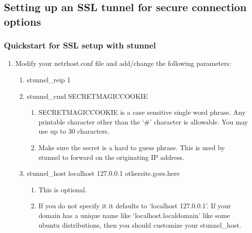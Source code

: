 \documentclass[letterpaper,10pt,english]{sphinxmanual}
\begin{document}
\subsection{Setting up an SSL tunnel for secure connection options}
\label{\detokenize{security:setting-up-an-ssl-tunnel-for-secure-connection-options}}

\subsubsection{Quickstart for SSL setup with stunnel}
\label{\detokenize{security:quickstart-for-ssl-setup-with-stunnel}}\begin{enumerate}
%
\item {} 
\sphinxAtStartPar
Modify your netrhost.conf file and add/change the following parameters:
\begin{enumerate}
%
\item {} 
\sphinxAtStartPar
stunnel\_reip 1

\item {} 
\sphinxAtStartPar
stunnel\_cmd SECRET\sphinxhyphen{}MAGIC\sphinxhyphen{}COOKIE
\begin{enumerate}
%
\item {} 
\sphinxAtStartPar
SECRET\sphinxhyphen{}MAGIC\sphinxhyphen{}COOKIE is a case sensitive single word phrase. Any printable character other than the ‘\#’ character is allowable.  You may use up to 30 characters.

\item {} 
\sphinxAtStartPar
Make sure the secret is a hard to guess phrase.  This is used by stunnel to forward on the originating IP address.

\end{enumerate}

\item {} 
\sphinxAtStartPar
stunnel\_host localhost 127.0.0.1 othersite.goes.here
\begin{enumerate}
%
\item {} 
\sphinxAtStartPar
This is optional.

\item {} 
\sphinxAtStartPar
If you do not specify it it defaults to ‘localhost 127.0.0.1’.  If your domain has a unique name like ‘localhost.localdomain’ like some ubuntu distributions, then you should customize your stunnel\_host.


\end{enumerate}
\end{enumerate}
\end{enumerate}
\end{document}
